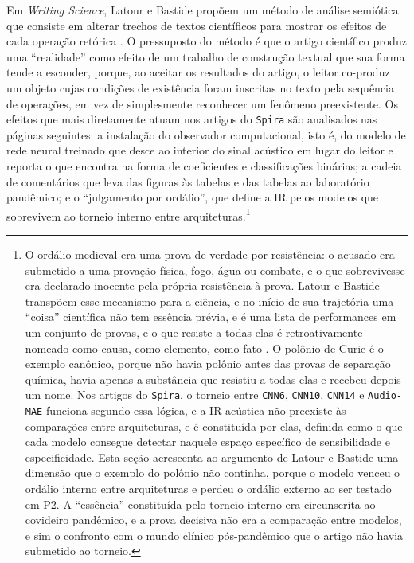 Em \textit{Writing Science}, Latour e Bastide propõem um método de análise semiótica que consiste em alterar trechos de textos científicos para mostrar os efeitos de cada operação retórica \parencite{Latour1986Writing}. O pressuposto do método é que o artigo científico produz uma \enquote{realidade} como efeito de um trabalho de construção textual que sua forma tende a esconder, porque, ao aceitar os resultados do artigo, o leitor co-produz um objeto cujas condições de existência foram inscritas no texto pela sequência de operações, em vez de simplesmente reconhecer um fenômeno preexistente. Os efeitos que mais diretamente atuam nos artigos do \texttt{Spira} são analisados nas páginas seguintes: a instalação do observador computacional, isto é, do modelo de rede neural treinado que desce ao interior do sinal acústico em lugar do leitor e reporta o que encontra na forma de coeficientes e classificações binárias; a cadeia de comentários que leva das figuras às tabelas e das tabelas ao laboratório pandêmico; e o \enquote{julgamento por ordálio}, que define a IR pelos modelos que sobrevivem ao torneio interno entre arquiteturas.\footnote{O ordálio medieval era uma prova de verdade por resistência: o acusado era submetido a uma provação física, fogo, água ou combate, e o que sobrevivesse era declarado inocente pela própria resistência à prova. Latour e Bastide transpõem esse mecanismo para a ciência, e no início de sua trajetória uma \enquote{coisa} científica não tem essência prévia, e é uma lista de performances em um conjunto de provas, e o que resiste a todas elas é retroativamente nomeado como causa, como elemento, como fato \parencite[pp.~63--64]{Latour1986Writing}. O polônio de Curie é o exemplo canônico, porque não havia polônio antes das provas de separação química, havia apenas a substância que resistiu a todas elas e recebeu depois um nome. Nos artigos do \texttt{Spira}, o torneio entre \texttt{CNN6}, \texttt{CNN10}, \texttt{CNN14} e \texttt{Audio-MAE} funciona segundo essa lógica, e a IR acústica não preexiste às comparações entre arquiteturas, e é constituída por elas, definida como o que cada modelo consegue detectar naquele espaço específico de sensibilidade e especificidade. Esta seção acrescenta ao argumento de Latour e Bastide uma dimensão que o exemplo do polônio não continha, porque o modelo venceu o ordálio interno entre arquiteturas e perdeu o ordálio externo ao ser testado em P2. A \enquote{essência} constituída pelo torneio interno era circunscrita ao covideiro pandêmico, e a prova decisiva não era a comparação entre modelos, e sim o confronto com o mundo clínico pós-pandêmico que o artigo não havia submetido ao torneio.}

